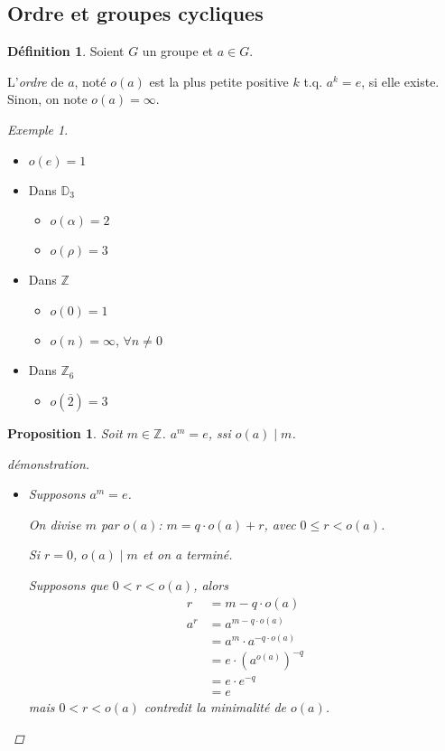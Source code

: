 \documentclass{report}
\newcommand*{\entiers}{\mathbb{Z}}
\newtheorem*{prop}{Proposition}
\theoremstyle{definition}
\newtheorem*{defin}{D\'efinition}
\theoremstyle{remark}
\newtheorem*{exem}{Exemple}
\begin{document}
	\subsection{Ordre et groupes cycliques}
	\begin{defin}
		Soient $G$ un groupe et $a \in G$.

		L'\emph{ordre} de $a$, not\'e $o(a)$ est la plus petite positive $k$ t.q. $a^k=e$, si elle existe. Sinon, on note $o(a) = \infty$.
	\end{defin}
	\begin{exem}~

		\begin{itemize}
			\item $o(e)=1$
			\item Dans $\mathbb{D}_3$
			\begin{itemize}
				\item $o(\alpha) = 2$
				\item $o(\rho) = 3$
			\end{itemize}
			\item Dans $\entiers$
			\begin{itemize}
				\item $o(0) = 1$
				\item $o(n) = \infty$, $\forall n\neq0$
			\end{itemize}
			\item Dans $\entiers_6$
			\begin{itemize}
				\item $o(\overline2) = 3$
			\end{itemize}
		\end{itemize}
	\end{exem}
	\begin{prop}
		Soit $m \in \entiers$. $a^m = e$, ssi $o(a) \mid m$.
		\begin{proof}[d\'emonstration]~

			\begin{itemize}
				\item[$(\Rightarrow)$] Supposons $a^m=e$.

				On divise $m$ par $o(a)$: $m = q \cdot o(a) + r$, avec $0 \leq r < o(a)$.

				Si $r=0$, $o(a) \mid m$ et on a termin\'e.

				Supposons que $0<r<o(a)$, alors
				\begin{align*}
					r&= m-q \cdot o(a)\\
					a^r&= a^{m-q \cdot o(a)}\\
					&= a^m \cdot a^{-q \cdot o(a)}\\
					&= e \cdot (a^{o(a)})^{-q}\\
					&= e \cdot e^{-q}\\
					&= e
				\end{align*}
				mais $0<r<o(a)$ contredit la minimalit\'e de $o(a)$.
			\end{itemize}
		\end{proof}
	\end{prop}
\end{document}
